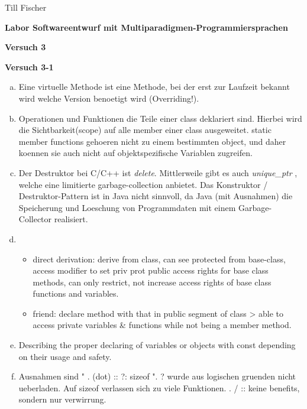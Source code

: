 \documentclass[german,10pt,oneside, fleqn, a4paper]{article}
\begin{document}
Till Fischer\\

    
\vspace{1cm}

\begin{center}
{\bf \Large Labor Softwareentwurf mit Multiparadigmen-Programmiersprachen} \\[2ex]
\end{center}
\begin{center}
{\bf \Large Versuch 3} \\[1ex]
\end{center}
\vspace{2cm}

{\bf Versuch 3-1} \\[2ex]
\begin{enumerate}[a)]
	\item Eine virtuelle Methode ist eine Methode, bei der erst zur Laufzeit bekannt wird welche Version benoetigt wird (Overriding!).
	\item Operationen und Funktionen die Teile einer class deklariert sind. Hierbei wird die Sichtbarkeit(scope) auf alle member einer class ausgeweitet. static member functions gehoeren nicht zu einem bestimmten object, und daher koennen sie auch nicht auf objektspezifische Variablen zugreifen.
	\item Der Destruktor bei {C/C++} ist \textit{delete}. Mittlerweile gibt es auch \textit {unique\_ptr} , welche eine limitierte garbage-collection anbietet. Das Konstruktor / Destruktor-Pattern ist in Java nicht sinnvoll, da Java (mit Ausnahmen) die Speicherung und Loeschung von Programmdaten mit einem Garbage-Collector realisiert.
	\item 
		\begin{itemize}
				\item direct derivation: derive from class, can see protected from base-class, access modifier to set priv \/ prot \/ public access rights for base class methods, can only restrict, not increase access rights of base class functions and variables.
				\item friend: declare method with that in public segment of class > able to access private variables \& functions while not being a member method.
		\end{itemize}

	\item Describing the proper declaring of variables or objects with const depending on their usage and safety.
	\item 
	Ausnahmen sind  " . (dot)  ::  ?:  sizeof ".
	? wurde aus logischen gruenden nicht ueberladen.
	Auf sizeof  verlassen sich zu viele Funktionen.
	. / :: keine benefits, sondern nur verwirrung.
	
\end{enumerate}
\end{document}
